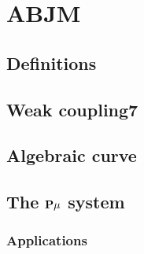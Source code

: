 
\section{ABJM}

\subsection{Definitions}

\subsection{Weak coupling7}

\subsection{Algebraic curve}

\subsection{The ${\bf P}\mu$ system}

\subsubsection{Applications}